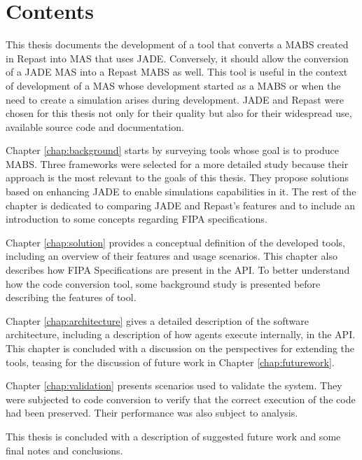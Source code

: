 
\section{Contents}

This thesis documents the development of a tool that converts a MABS created in Repast into MAS that uses JADE. Conversely, it should allow the conversion of a JADE MAS into a Repast MABS as well. This tool is useful in the context of development of a MAS whose development started as a MABS or when the need to create a simulation arises during development. JADE and Repast were chosen for this thesis not only for their quality but also for their widespread use, available source code and documentation.

Chapter \ref{chap:background} starts by surveying tools whose goal is to produce MABS. Three frameworks were selected for a more detailed study because their approach is the most relevant to the goals of this thesis. They propose solutions based on enhancing JADE to enable simulations capabilities in it. The rest of the chapter is dedicated to comparing JADE and Repast's features and to include an introduction to some concepts regarding FIPA specifications.

Chapter \ref{chap:solution} provides a conceptual definition of the developed tools, including an overview of their features and usage scenarios. This chapter also describes how FIPA Specifications are present in the API. To better understand how the code conversion tool, some background study is presented before describing the features of tool.

Chapter \ref{chap:architecture} gives a detailed description of the software architecture, including a description of how agents execute internally, in the API. This chapter is concluded with a discussion on the perspectives for extending the tools, teasing for the discussion of future work in Chapter \ref{chap:futurework}.

Chapter \ref{chap:validation} presents scenarios used to validate the system. They were subjected to code conversion to verify that the correct execution of the code had been preserved. Their performance was also subject to analysis.

This thesis is concluded with a description of suggested future work and some final notes and conclusions.